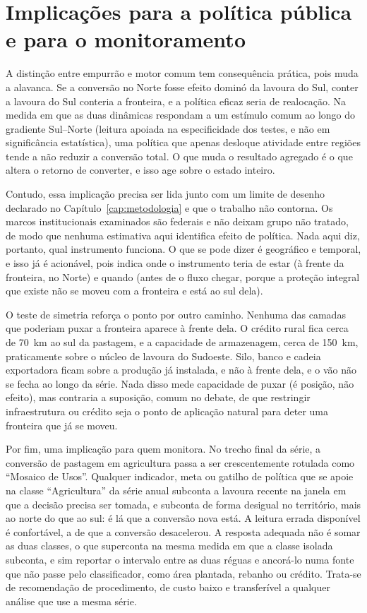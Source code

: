 \section{Implicações para a política pública e para o monitoramento}
\label{sec:disc-politica}

A distinção entre empurrão e motor comum tem consequência prática, pois muda a
alavanca. Se a conversão no Norte fosse efeito dominó da lavoura do Sul,
conter a lavoura do Sul conteria a fronteira, e a política eficaz seria de
realocação. Na medida em que as duas dinâmicas respondam a um estímulo comum
ao longo do gradiente Sul--Norte (leitura apoiada na especificidade dos testes,
e não em significância estatística), uma
política que apenas desloque atividade entre regiões tende a não reduzir a
conversão total. O que muda o resultado agregado é o que altera o retorno de
converter, e isso age sobre o estado inteiro.

Contudo, essa implicação precisa ser lida junto com um limite de desenho
declarado no Capítulo~\ref{cap:metodologia} e que o trabalho não contorna. Os
marcos institucionais examinados são federais e não deixam grupo não tratado,
de modo que nenhuma estimativa aqui identifica efeito de política. Nada aqui
diz, portanto, qual instrumento funciona. O que se pode dizer é geográfico e
temporal, e isso já é acionável, pois indica onde o instrumento teria de estar (à
frente da fronteira, no Norte) e quando (antes de o fluxo chegar, porque a
proteção integral que existe não se moveu com a fronteira e está ao sul dela).

O teste de simetria reforça o ponto por outro caminho. Nenhuma das camadas que
poderiam puxar a fronteira aparece à frente dela. O crédito rural fica cerca
de 70~km ao sul da pastagem, e a capacidade de armazenagem, cerca de 150~km,
praticamente sobre o núcleo de lavoura do Sudoeste. Silo, banco e cadeia
exportadora ficam sobre a produção já instalada, e não à frente dela, e o vão
não se fecha ao longo da série. Nada disso mede capacidade de puxar (é
posição, não efeito), mas contraria a suposição, comum no debate, de que
restringir infraestrutura ou crédito seja o ponto de aplicação natural para
deter uma fronteira que já se moveu.

Por fim, uma implicação para quem monitora. No trecho final da série, a
conversão de pastagem em agricultura passa a ser crescentemente rotulada como
``Mosaico de Usos''. Qualquer indicador, meta ou gatilho de política que se
apoie na classe ``Agricultura'' da série anual subconta a lavoura recente na
janela em que a decisão precisa ser tomada, e subconta de forma desigual no
território, mais ao norte do que ao sul: é lá que a conversão nova está. A
leitura errada disponível é confortável, a de que a conversão desacelerou. A
resposta adequada não é somar as duas classes, o que superconta na mesma
medida em que a classe isolada subconta, e sim reportar o intervalo entre as
duas réguas e ancorá-lo numa fonte que não passe pelo classificador, como área
plantada, rebanho ou crédito. Trata-se de recomendação de procedimento, de
custo baixo e transferível a qualquer análise que use a mesma série.

